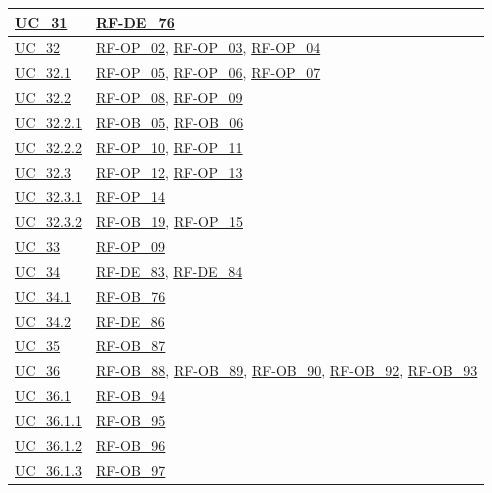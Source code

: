 \begin{longtable}{|
        >{\raggedright\arraybackslash}p{} |
        >{\raggedright\arraybackslash}p{} |
    }
    \hyperref[uc_31]{UC\_31} & \hyperlink{rf-de_76}{RF-DE\_76} \\
    \hline

    \hyperref[uc_32]{UC\_32} & \hyperlink{rf-op_2}{RF-OP\_02}, \hyperlink{rf-op_3}{RF-OP\_03}, \hyperlink{rf-op_4}{RF-OP\_04} \\
    \hline
    \hyperref[uc_32.1]{UC\_32.1} & \hyperlink{rf-op_5}{RF-OP\_05}, \hyperlink{rf-op_6}{RF-OP\_06}, \hyperlink{rf-op_7}{RF-OP\_07} \\
    \hline
    \hyperref[uc_32.2]{UC\_32.2} & \hyperlink{rf-op_8}{RF-OP\_08}, \hyperlink{rf-op_9}{RF-OP\_09} \\
    \hline
    \hyperref[uc_32.2.1]{UC\_32.2.1} & \hyperlink{rf-ob_5}{RF-OB\_05}, \hyperlink{rf-ob_6}{RF-OB\_06} \\
    \hline
    \hyperref[uc_32.2.2]{UC\_32.2.2} & \hyperlink{rf-op_10}{RF-OP\_10}, \hyperlink{rf-op_11}{RF-OP\_11} \\
    \hline
    \hyperref[uc_32.3]{UC\_32.3} & \hyperlink{rf-op_12}{RF-OP\_12}, \hyperlink{rf-op_13}{RF-OP\_13} \\
    \hline
    \hyperref[uc_32.3.1]{UC\_32.3.1} & \hyperlink{rf-op_14}{RF-OP\_14} \\
    \hline
    \hyperref[uc_32.3.2]{UC\_32.3.2} & \hyperlink{rf-ob_19}{RF-OB\_19}, \hyperlink{rf-op_15}{RF-OP\_15} \\
    \hline

    \hyperref[uc_33]{UC\_33} & \hyperlink{rf-op_9}{RF-OP\_09} \\
    \hline

    \hyperref[uc_34]{UC\_34} & \hyperlink{rf-de_83}{RF-DE\_83}, \hyperlink{rf-de_84}{RF-DE\_84} \\
    \hline
    \hyperref[uc_34.1]{UC\_34.1} & \hyperlink{rf-ob_76}{RF-OB\_76} \\
    \hline
    \hyperref[uc_34.2]{UC\_34.2} & \hyperlink{rf-de_86}{RF-DE\_86} \\
    \hline

    \hyperref[uc_35]{UC\_35} & \hyperlink{rf-ob_87}{RF-OB\_87} \\
    \hline

    \hyperref[uc_36]{UC\_36} & \hyperlink{rf-ob_88}{RF-OB\_88}, \hyperlink{rf-ob_89}{RF-OB\_89}, \hyperlink{rf-ob_90}{RF-OB\_90}, \hyperlink{rf-ob_92}{RF-OB\_92}, \hyperlink{rf-ob_93}{RF-OB\_93} \\
    \hline
    \hyperref[uc_36.1]{UC\_36.1} & \hyperlink{rf-ob_94}{RF-OB\_94}\\
    \hline
    \hyperref[uc_36.1.1]{UC\_36.1.1} & \hyperlink{rf-ob_95}{RF-OB\_95} \\
    \hline
    \hyperref[uc_36.1.2]{UC\_36.1.2} & \hyperlink{rf-ob_96}{RF-OB\_96} \\
    \hline
    \hyperref[uc_36.1.3]{UC\_36.1.3} & \hyperlink{rf-ob_97}{RF-OB\_97}\\


\end{longtable}

